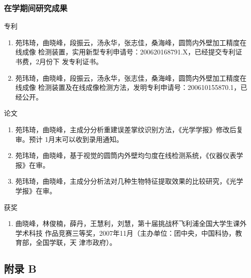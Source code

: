 \documentclass{beamer}
\begin{document}
\begin{frame}[label=patent]
  \frametitle{在学期间研究成果}
  \begin{overprint}
  \begin{block}{专利}
  \begin{enumerate}
  \item
  苑玮琦，曲晓峰，段振云，汤永华，张志佳，桑海峰，圆筒内外壁加工精度在线成像
  检测装置，实用新型专利申请号：200620168791.X，已经提交专利证书费，2月份下
  发专利证书。
  \item
  苑玮琦，曲晓峰，段振云，汤永华，张志佳，桑海峰，圆筒内外壁加工精度在线成像
  检测装置及在线成像检测方法，发明专利申请号：200610155870.1，已经公开。
  \end{enumerate}
  \end{block}
  \begin{block}{论文}
  \begin{enumerate}
  \item
  苑玮琦，曲晓峰，主成分分析重建误差掌纹识别方法，《光学学报》修改后复审。预计
  1月末可以收到录用通知。
  \item
  苑玮琦，曲晓峰，基于视觉的圆筒内外壁均匀度在线检测系统，《仪器仪表学报》在审。
  \item
  苑玮琦，曲晓峰，主成分分析法对几种生物特征提取效果的比较研究，《光学学报》在审。
  \end{enumerate}
  \end{block}
  \begin{block}{获奖}
  \begin{enumerate}
  \item
  曲晓峰，林俊楠，薛丹，王慧利，刘慧，第十届挑战杯飞利浦全国大学生课外学术科技
  作品竞赛三等奖，2007年11月（主办单位：团中央，中国科协，教育部，全国学联，天
  津市政府）。
  \end{enumerate}
  \end{block}
  \end{overprint}
  \hyperlink{conclusion<1>}{}
\end{frame}

\subsection*{附录 B}
\end{document}
